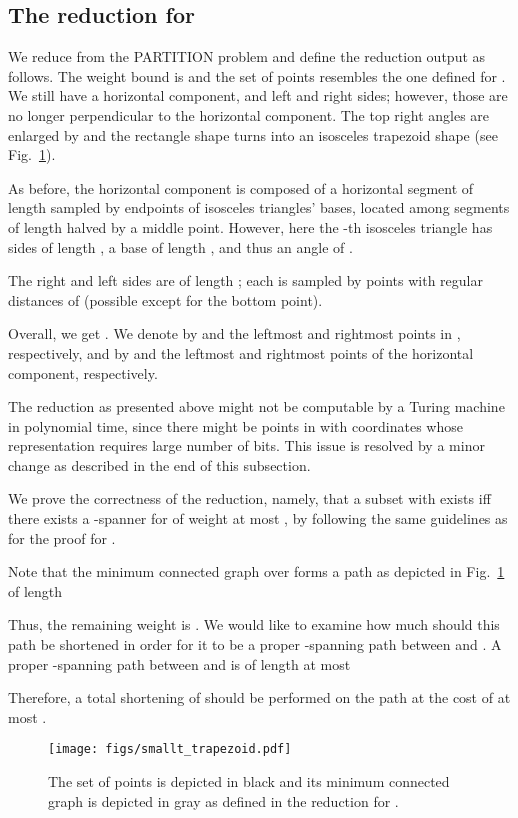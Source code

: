 \documentclass[a4paper]{llncs}
\begin{document}
\subsection{The reduction for }\label{subsec:1<t<2}

We reduce from the PARTITION problem
and define the reduction output  as follows.
The weight bound is  and the set of points 
resembles the one defined for . 
We still have a horizontal component, and left and right sides;
however, those are no longer perpendicular to the horizontal component.
The top right angles are enlarged by  
and the rectangle shape turns into an isosceles trapezoid shape (see Fig.~\ref{fig:smallt}).

As before, the horizontal component is composed of a horizontal segment of length  
sampled by  endpoints of  isosceles triangles' bases, 
located among  segments of length 
halved by a middle point. 
However, here the -th isosceles triangle has sides of length , 
a base of length , and thus an angle of .

The right and left sides are of length ;
each is sampled by 
points with regular distances of  (possible except for the bottom point).

Overall, we get .
We denote by  and  the leftmost and rightmost points in , respectively,
and by  and  the leftmost and rightmost points of the horizontal component, respectively.

The reduction as presented above might not be computable by a Turing machine in polynomial time,
since there might be points in  with coordinates whose representation requires large number of bits.
This issue is resolved by a minor change as described in the end of this subsection.

We prove the correctness of the reduction, namely, 
that a subset  with  exists 
iff there exists a -spanner for  of weight at most ,
by following the same guidelines as for the proof for .

Note that the minimum connected graph over  forms a path
 as depicted in Fig.~\ref{fig:smallt}
of length 

Thus, the remaining weight is .
We would like to examine how much should this path be shortened 
in order for it to be a proper -spanning path between  and .
A proper -spanning path between  and  is of length at most 

Therefore, a total shortening of  should be performed on the path
at the cost of at most .
\begin{figure}[htb]
    \centering
        \texttt{[image: figs/smallt\_trapezoid.pdf]}
    \caption{The set of points  is depicted in black 
    and its minimum connected graph is depicted in gray as defined in the reduction for .}
    \label{fig:smallt}
\end{figure}
\end{document}
